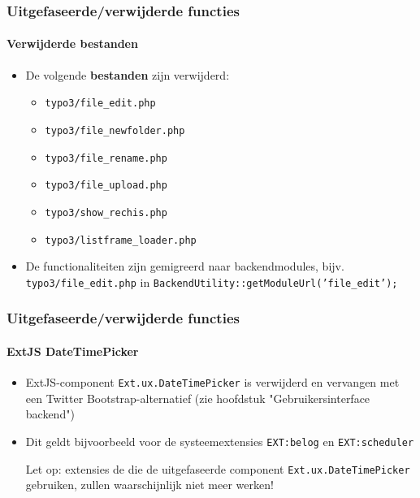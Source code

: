 \begin{frame}[fragile]
	\frametitle{Uitgefaseerde/verwijderde functies}
	\framesubtitle{Verwijderde bestanden}

	\begin{itemize}
		\item De volgende \textbf{bestanden} zijn verwijderd:

			\begin{itemize}
				\item \texttt{typo3/file\_edit.php}
				\item \texttt{typo3/file\_newfolder.php}
				\item \texttt{typo3/file\_rename.php}
				\item \texttt{typo3/file\_upload.php}
				\item \texttt{typo3/show\_rechis.php}
				\item \texttt{typo3/listframe\_loader.php}
			\end{itemize}

		\item De functionaliteiten zijn gemigreerd naar backendmodules,
			bijv. \texttt{typo3/file\_edit.php} in \texttt{BackendUtility::getModuleUrl('file\_edit');}

	\end{itemize}

\end{frame}


\begin{frame}[fragile]
	\frametitle{Uitgefaseerde/verwijderde functies}
	\framesubtitle{ExtJS DateTimePicker}

	\begin{itemize}

		\item ExtJS-component \texttt{Ext.ux.DateTimePicker} is verwijderd en vervangen met 
			een Twitter Bootstrap-alternatief (zie hoofdstuk "Gebruikersinterface backend")

		\item Dit geldt bijvoorbeeld voor de systeemextensies \texttt{EXT:belog} en
			\texttt{EXT:scheduler} 

			\vspace{0.2cm}

			\begingroup
				\color{red}
					Let op: extensies de die de uitgefaseerde component
					\texttt{Ext.ux.DateTimePicker} gebruiken, zullen waarschijnlijk niet meer werken!
			\endgroup

	\end{itemize}

\end{frame}

